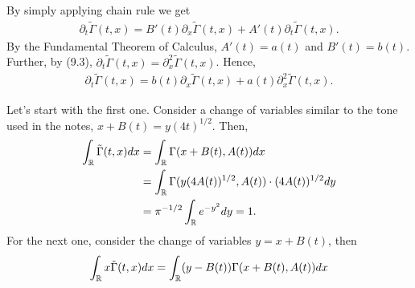 \begin{questions}

\begin{solution}
By simply applying chain rule we get
\begin{align*}
\partial_t\tilde{\Gamma}(t,x)=B'(t)\partial_x\tilde{\Gamma}(t,x)+A'(t)\partial_t\tilde{\Gamma}(t,x).
\end{align*}
By the Fundamental Theorem of Calculus, $A'(t)=a(t)$ and $B'(t)=b(t)$. Further, by (9.3), $\partial_t\tilde{\Gamma}(t,x)=\partial^2_x\tilde{\Gamma}(t,x)$. Hence,
\begin{align*}
\partial_t\tilde{\Gamma}(t,x)=b(t)\partial_x\tilde{\Gamma}(t,x)+a(t)\partial^2_x\tilde{\Gamma}(t,x).
\end{align*}
\end{solution}
\begin{solution}
Let's start with the first one. Consider a change of variables similar to the tone used in the notes, $x+B(t)=y(4t)^{1/2}$. Then,
\begin{align*}
\int_{\mathbb{R}}\tilde{\Gamma}(t,x)dx&=\int_{\mathbb{R}}\Gamma(x+B(t),A(t))dx\\
&=\int_{\mathbb{R}}\Gamma(y(4A(t))^{1/2},A(t))\cdot(4A(t))^{1/2}dy\\
&=\pi^{-1/2}\int_{\mathbb{R}}e^{-y^2}dy=1.
\end{align*}
For the next one, consider the change of variables $y=x+B(t)$, then
\begin{align*}
\int_{\R}x\tilde{\Gamma}(t,x)dx&=\int_{\R}(y-B(t))\Gamma(x+B(t),A(t))dx\\

\end{align*}
\end{solution}
\end{questions}
